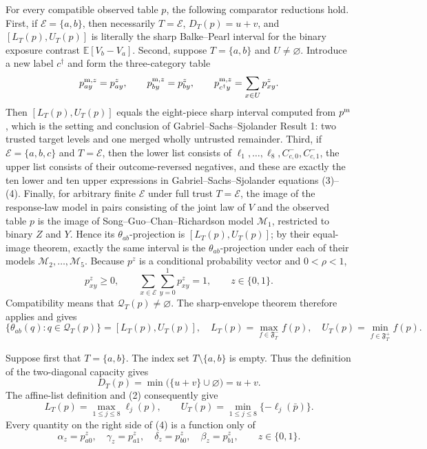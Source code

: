 For every compatible observed table \(p\), the following comparator reductions hold.  First, if \(\mathcal E=\{a,b\}\), then necessarily \(T=\mathcal E\), \(D_T(p)=u+v\), and \([L_T(p),U_T(p)]\) is literally the sharp Balke--Pearl interval for the binary exposure contrast \(\mathbb E[V_b-V_a]\).  Second, suppose \(T=\{a,b\}\) and \(U\neq\varnothing\).  Introduce a new label \(c^\dagger\) and form the three-category table
\[
 p^{{\rm m},z}_{ay}=p^z_{ay},\qquad
 p^{{\rm m},z}_{by}=p^z_{by},\qquad
 p^{{\rm m},z}_{c^\dagger y}=\sum_{x\in U}p^z_{xy}.
\]
Then \([L_T(p),U_T(p)]\) equals the eight-piece sharp interval computed from \(p^{\rm m}\), which is the setting and conclusion of Gabriel--Sachs--Sjolander Result 1: two trusted target levels and one merged wholly untrusted remainder.  Third, if \(\mathcal E=\{a,b,c\}\) and \(T=\mathcal E\), then the lower list consists of \(\ell_1,\ldots,\ell_8,C^-_{c,0},C^-_{c,1}\), the upper list consists of their outcome-reversed negatives, and these are exactly the ten lower and ten upper expressions in Gabriel--Sachs--Sjolander equations (3)--(4).  Finally, for arbitrary finite \(\mathcal E\) under full trust \(T=\mathcal E\), the image of the response-law model in pairs consisting of the joint law of \(V\) and the observed table \(p\) is the image of Song--Guo--Chan--Richardson model \(\mathcal M_1\), restricted to binary \(Z\) and \(Y\).  Hence its \(\theta_{ab}\)-projection is \([L_T(p),U_T(p)]\); by their equal-image theorem, exactly the same interval is the \(\theta_{ab}\)-projection under each of their models \(\mathcal M_2,\ldots,\mathcal M_5\).
Because \(p^z\) is a conditional probability vector and \(0<\rho<1\),
\[
 p^z_{xy}\geq 0,
 \qquad
 \sum_{x\in\mathcal E}\sum_{y=0}^1p^z_{xy}=1,
 \qquad z\in\{0,1\}.
 \tag{1}
\]
Compatibility means that \(\mathcal Q_T(p)\neq\varnothing\).  The sharp-envelope theorem therefore applies and gives
\[
 \{\theta_{ab}(q):q\in\mathcal Q_T(p)\}
 =[L_T(p),U_T(p)],
 \quad
 L_T(p)=\max_{f\in\mathfrak F^-_T}f(p),
 \quad
 U_T(p)=\min_{f\in\mathfrak F^+_T}f(p).
 \tag{2}
\]

Suppose first that \(T=\{a,b\}\).  The index set \(T\setminus\{a,b\}\) is empty.  Thus the definition of the two-diagonal capacity gives
\[
 D_T(p)
 =\min\bigl(\{u+v\}\cup\varnothing\bigr)
 =u+v.
 \tag{3}
\]
The affine-list definition and (2) consequently give
\[
 L_T(p)=\max_{1\leq j\leq8}\ell_j(p),
 \qquad
 U_T(p)=\min_{1\leq j\leq8}\{-\ell_j(\bar p)\}.
 \tag{4}
\]
Every quantity on the right side of (4) is a function only of
\[
 \alpha_z=p^z_{a0},\quad \gamma_z=p^z_{a1},\quad
 \delta_z=p^z_{b0},\quad \beta_z=p^z_{b1},
 \qquad z\in\{0,1\}.
 \tag{5}
\]

